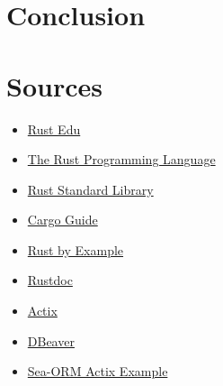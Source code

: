 \documentclass[a4paper,12pt]{article}
\begin{document}
	\section{Conclusion}

	\newpage
	\section{Sources}
	\label{sec:Sources}
	\begin{itemize}
		\item \href{https://rust-edu.org/resources/}{Rust Edu}
		\item \href{https://doc.rust-lang.org/book/}{The Rust Programming Language}
		\item \href{https://doc.rust-lang.org/std/}{Rust Standard Library}
		\item \href{https://doc.rust-lang.org/cargo/}{Cargo Guide}
		\item \href{https://doc.rust-lang.org/rust-by-example/}{Rust by Example}
		\item \href{https://doc.rust-lang.org/rustdoc/}{Rustdoc}
		\item \href{https://actix.rs/}{Actix}
		\item \href{https://dbeaver.io/}{DBeaver}
		\item \href{https://github.com/SeaQL/sea-orm/tree/master/examples/actix_example}{Sea-ORM Actix Example}
	\end{itemize}
	\printbibliography[title={Whole bibliography}]
\end{document}
